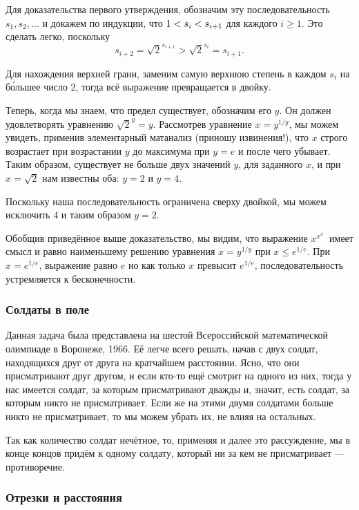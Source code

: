 Для доказательства первого утверждения, обозначим эту последовательность
$s_1, s_2,\dots$ и докажем по индукции, что $1<s_i\z<s_{i+1}$
для каждого $i\ge 1$.
Это сделать легко, поскольку \[s_{i+2}=
{\sqrt{2}}^{s_{i+1}}
>{\sqrt{2}}^{s_{i}}
=s_{i+1}.\]

Для нахождения верхней грани, заменим самую верхнюю степень в каждом $s_i$ на б\'{о}льшее число $2$, тогда всё выражение превращается в двойку.

Теперь, когда мы знаем, что предел существует, обозначим его $y$.
Он должен удовлетворять уравнению ${\sqrt{2}}^y=y$.
Рассмотрев уравнение $x=y^{1/y}$, 
мы можем увидеть, применив элементарный матанализ (приношу извинения!), 
что $x$ строго возрастает при возрастании $y$ до максимума при $y=e$
и после чего убывает.
Таким образом, существует не больше двух значений $y$, для заданного $x$, 
и при $x=\sqrt{2}$ нам известны оба: $y=2$ и $y=4$.

Поскольку наша последовательность ограничена сверху двойкой, мы можем исключить $4$ и таким образом $y=2$.\heart

Обобщив приведённое выше доказательство, мы видим, что выражение $x^{x^{x^{{\cdot}^{\cdot}}}}$
имеет смысл и равно наименьшему решению уравнения $x=y^{1/y}$ при $x\le e^{1/e}$.
При $x=e^{1/e}$, выражение равно $e$ но как только $x$ превысит $e^{1/e}$, последовательность устремляется к бесконечности.

\subsubsection*{Солдаты в поле}%

Данная задача была представлена на шестой Всероссийской математической олимпиаде в Воронеже, 1966.
Её легче всего решать, начав с двух солдат, находящихся друг от друга на кратчайшем расстоянии.
Ясно, что они присматривают друг другом, и если кто-то ещё смотрит на одного из них, тогда у нас имеется солдат, за которым присматривают дважды и, значит, есть солдат, за которым никто не присматривает.
Если же на этими двумя солдатами больше никто не присматривает, то мы можем убрать их, не влияя на остальных.

Так как количество солдат нечётное, то, применяя и далее это рассуждение, мы в конце концов придём к одному солдату, который ни за кем не присматривает --- противоречие.\heart

\subsubsection*{Отрезки и расстояния} %

